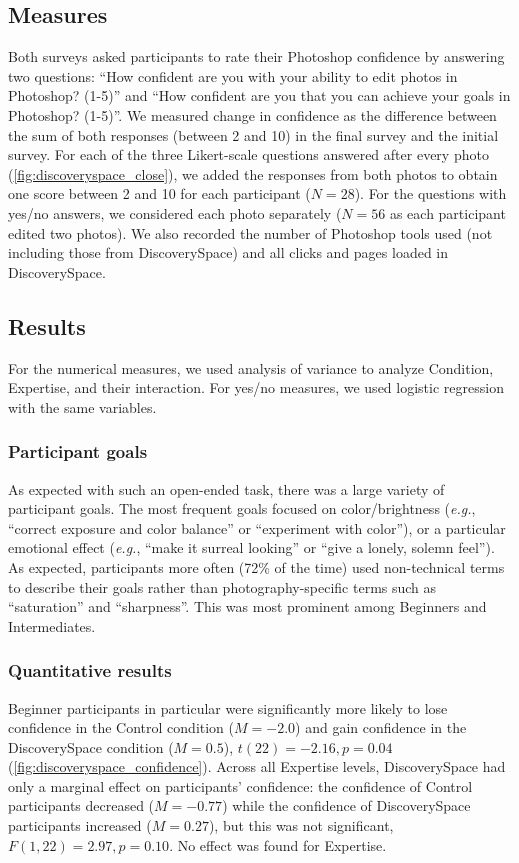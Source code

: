 \subsection{Measures}
Both surveys asked participants to rate their Photoshop confidence by answering two questions: ``How confident are you with your ability to edit photos in Photoshop? (1-5)'' and ``How confident are you that you can achieve your goals in Photoshop? (1-5)''. We measured change in confidence as the difference between the sum of both responses (between 2 and 10) in the final survey and the initial survey. For each of the three Likert-scale questions answered after every photo (\autoref{fig:discoveryspace_close}), we added the responses from both photos to obtain one score between 2 and 10 for each participant ($N = 28$). For the questions with yes/no answers, we considered each photo separately ($N = 56$ as each participant edited two photos). We also recorded the number of Photoshop tools used (not including those from Discovery\-Space) and all clicks and pages loaded in Discovery\-Space.

\subsection{Results}
For the numerical measures, we used analysis of variance to analyze Condition, Expertise, and their interaction. For yes/no measures, we used logistic regression with the same variables. 

\subsubsection{Participant goals}
As expected with such an open-ended task, there was a large variety of participant goals. The most frequent goals focused on color/brightness (\textit{e.g.}, ``correct exposure and color balance'' or ``experiment with color''), or a particular emotional effect (\textit{e.g.}, ``make it surreal looking'' or ``give a lonely, solemn feel''). As expected, participants more often (72\% of the time) used non-technical terms to describe their goals rather than photography-specific terms such as ``saturation'' and ``sharpness''. This was most prominent among Beginners and Intermediates.

\subsubsection{Quantitative results}
Beginner participants in particular were significantly more likely to lose confidence in the Control condition ($M = -2.0$) and gain confidence in the Discovery\-Space condition ($M = 0.5$), $t(22) = -2.16, p = 0.04$ (\autoref{fig:discoveryspace_confidence}). Across all Expertise levels, Discovery\-Space had only a marginal effect on participants' confidence: the confidence of Control participants decreased ($M = -0.77$) while the confidence of Discovery\-Space participants increased ($M = 0.27$), but this was not significant, $F(1, 22) = 2.97, p = 0.10$. No effect was found for Expertise. 


